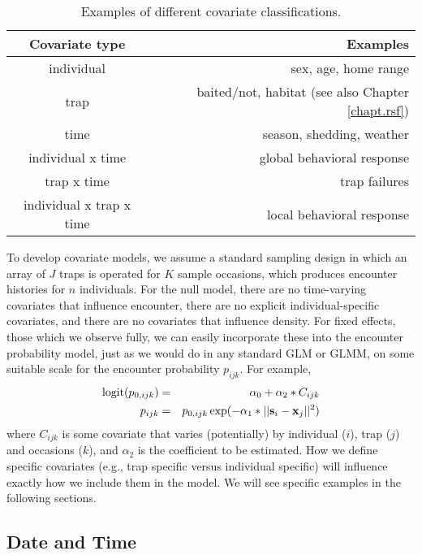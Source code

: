 \begin{table}[ht]
\centering
\caption{Examples of different covariate classifications.}
\begin{tabular}{cr}
\hline
Covariate type & Examples \\
\hline
individual & sex, age, home range \\
trap  &  baited/not, habitat (see also Chapter \ref{chapt.rsf}) \\
time  &  season, shedding,  weather  \\
individual x time    &    global behavioral response \\
trap x time     &       trap failures  \\ 
individual x trap x time  &   local behavioral response  \\
\end{tabular}
\label{covariates.tab.covclass}
\end{table}


To develop covariate models, we assume a standard sampling design in which an
array of $J$ traps is operated for $K$ sample occasions, which produces
encounter histories for $n$ individuals.  For the null model, there
are no time-varying covariates that influence encounter, there are no
explicit individual-specific covariates, and there are no covariates
that influence density.  For fixed effects, those which we observe
fully, we can easily incorporate these into the encounter probability
model, just as we would do in any standard GLM or GLMM, on some
suitable scale for the encounter probability $p_{ijk}$. For example,
\begin{eqnarray*}
\mbox{logit}(p_{0,ijk}) &=& \alpha_0 + \alpha_2*C_{ijk} \\
p_{ijk} &=& p_{0,ijk} \exp(- \alpha_1*||{\bf s}_{i}-{\bf x}_{j}||^2) 
\end{eqnarray*}
where $C_{ijk}$ is some covariate that varies (potentially) by
individual ($i$), trap ($j$) and occasions ($k$), and
$\alpha_2$ is the coefficient to be estimated.
 How we define specific covariates (e.g., trap specific
versus individual specific) will influence exactly how we include them
in the model. We will see specific examples in the following sections.  

\subsection{Date and Time}

